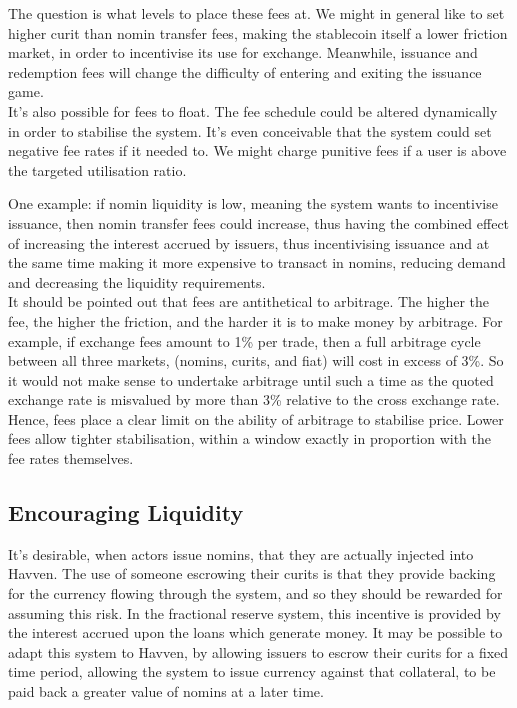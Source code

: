 \documentclass{article}
\begin{document}
The question is what levels to place these fees at. We might in general like to set
higher curit than nomin transfer fees, making the stablecoin itself a lower friction market,
in order to incentivise its use for exchange. Meanwhile, issuance and redemption fees will
change the difficulty of entering and exiting the issuance game. \\

It's also possible for fees to float. The fee schedule could be altered dynamically in order
to stabilise the system. It's even conceivable that the system could set negative fee rates if it needed to.
We might charge punitive fees if a user is above the targeted utilisation ratio.

One example: if nomin liquidity is low, meaning the system wants to incentivise issuance,
then nomin transfer fees could increase, thus having the combined effect of increasing the interest accrued
by issuers, thus incentivising issuance and at the same time making it more expensive to transact in nomins,
reducing demand and decreasing the liquidity requirements. \\

It should be pointed out that fees are antithetical to arbitrage. The higher the fee,
the higher the friction, and the harder it is to make money by arbitrage. For example, if
exchange fees amount to 1\% per trade, then a full arbitrage cycle between all three markets,
(nomins, curits, and fiat) will cost in excess of 3\%. So it would not make sense to undertake
arbitrage until such a time as the quoted exchange rate is misvalued by more than 3\% relative
to the cross exchange rate. Hence, fees place a clear limit on the ability of arbitrage to 
stabilise price. Lower fees allow tighter stabilisation, within a window exactly in proportion
with the fee rates themselves.


\pagebreak
\subsection{Encouraging Liquidity}

It's desirable, when actors issue nomins, that they are actually injected into Havven.
The use of someone escrowing their curits is that they provide backing for the currency flowing through the system,
and so they should be rewarded for assuming this risk. In the fractional reserve system,
this incentive is provided by the interest accrued upon the loans which generate money.
It may be possible to adapt this system to Havven, by allowing issuers to escrow their curits
for a fixed time period, allowing the system to issue currency against that collateral,
to be paid back a greater value of nomins at a later time. \\
\end{document}
